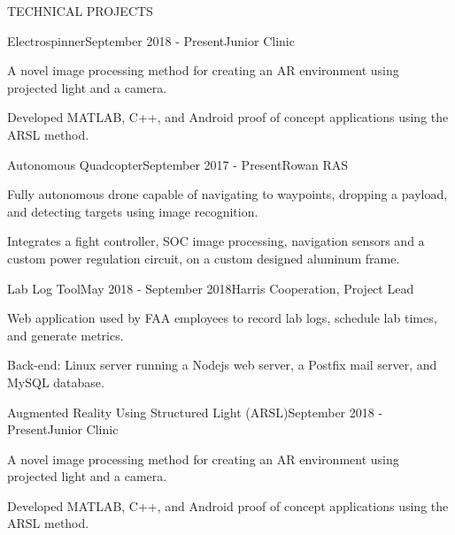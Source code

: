 \documentclass{resume} %
\begin{document}
\begin{rSection}{TECHNICAL PROJECTS}

\begin{rSubsection}{Electrospinner}{September 2018 - Present}{Junior Clinic}{}
\item A novel image processing method for creating an AR environment using
  projected light and a camera.
\item Developed MATLAB, C++, and Android proof of concept applications using the
  ARSL method.
\end{rSubsection}


\begin{rSubsection}{Autonomous Quadcopter}{September 2017 - Present}{Rowan RAS}{}
\item Fully autonomous drone capable of navigating to waypoints, dropping a
  payload, and detecting targets using image recognition.
\item Integrates a fight controller, SOC image processing, navigation sensors
  and a custom power regulation circuit, on a custom designed aluminum frame.
\end{rSubsection}


\begin{rSubsection}{Lab Log Tool}{May 2018 - September 2018}{Harris Cooperation, Project Lead}{}
\item Web application used by FAA employees to record lab logs, schedule lab times, and generate metrics.
\item Back-end: Linux server running a Nodejs web server, a Postfix mail server, and MySQL database.
\end{rSubsection}


\begin{rSubsection}{Augmented Reality Using Structured Light (ARSL)}{September 2018 - Present}{Junior Clinic}{}
\item A novel image processing method for creating an AR environment using
  projected light and a camera.
\item Developed MATLAB, C++, and Android proof of concept applications using the
  ARSL method.
\end{rSubsection}



\end{rSection}
\end{document}
